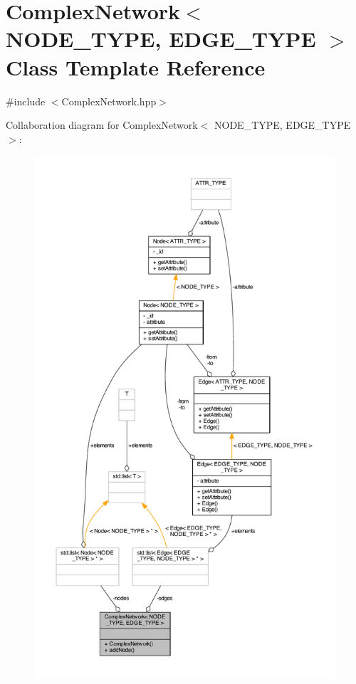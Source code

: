 \hypertarget{class_complex_network}{\section{Complex\+Network$<$ N\+O\+D\+E\+\_\+\+T\+Y\+P\+E, E\+D\+G\+E\+\_\+\+T\+Y\+P\+E $>$ Class Template Reference}
\label{class_complex_network}
}


{\ttfamily \#include $<$Complex\+Network.\+hpp$>$}



Collaboration diagram for Complex\+Network$<$ N\+O\+D\+E\+\_\+\+T\+Y\+P\+E, E\+D\+G\+E\+\_\+\+T\+Y\+P\+E $>$\+:\nopagebreak
\begin{figure}[H]
\begin{center}
\leavevmode
\includegraphics[height=550pt]{class_complex_network__coll__graph}
\end{center}
\end{figure}
